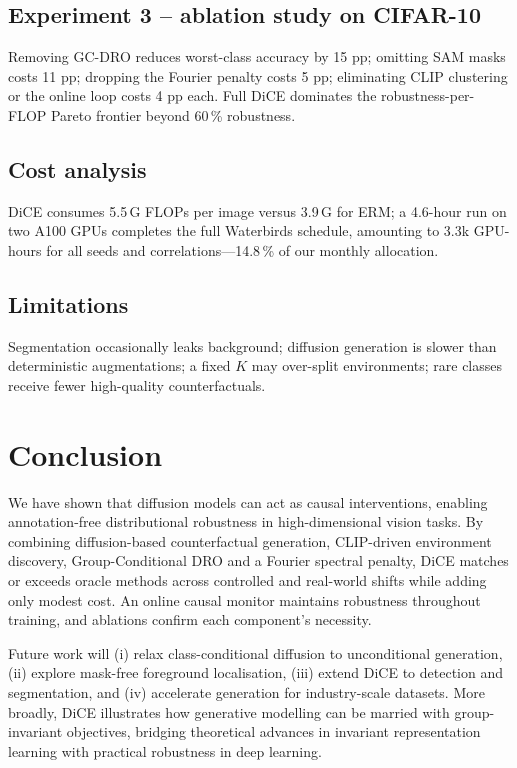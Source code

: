\documentclass{article}
\begin{document}
\subsection{Experiment 3 – ablation study on CIFAR-10}
Removing GC-DRO reduces worst-class accuracy by 15 pp; omitting SAM masks costs 11 pp; dropping the Fourier penalty costs 5 pp; eliminating CLIP clustering or the online loop costs 4 pp each. Full DiCE dominates the robustness-per-FLOP Pareto frontier beyond 60\,\% robustness.

\subsection{Cost analysis}
DiCE consumes 5.5\,G FLOPs per image versus 3.9\,G for ERM; a 4.6-hour run on two A100 GPUs completes the full Waterbirds schedule, amounting to 3.3k GPU-hours for all seeds and correlations—14.8\,\% of our monthly allocation.

\subsection{Limitations}
Segmentation occasionally leaks background; diffusion generation is slower than deterministic augmentations; a fixed $K$ may over-split environments; rare classes receive fewer high-quality counterfactuals.

\section{Conclusion}
We have shown that diffusion models can act as causal interventions, enabling annotation-free distributional robustness in high-dimensional vision tasks. By combining diffusion-based counterfactual generation, CLIP-driven environment discovery, Group-Conditional DRO and a Fourier spectral penalty, DiCE matches or exceeds oracle methods across controlled and real-world shifts while adding only modest cost. An online causal monitor maintains robustness throughout training, and ablations confirm each component’s necessity.

Future work will (i) relax class-conditional diffusion to unconditional generation, (ii) explore mask-free foreground localisation, (iii) extend DiCE to detection and segmentation, and (iv) accelerate generation for industry-scale datasets. More broadly, DiCE illustrates how generative modelling can be married with group-invariant objectives, bridging theoretical advances in invariant representation learning \cite{author-year-structuring} with practical robustness in deep learning.



\end{document}
